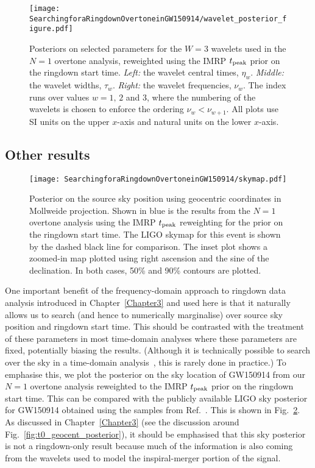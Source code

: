 \begin{figure}[t]
    \centering
    \texttt{[image: SearchingforaRingdownOvertoneinGW150914/wavelet\_posterior\_figure.pdf]}
    \caption[Posteriors on selected wavelet parameters]{ 
    Posteriors on selected parameters for the $W=3$ wavelets used in the $N=1$ overtone analysis, reweighted using the IMRP $t_{\rm peak}$ prior on the ringdown start time.
    \emph{Left:} the wavelet central times, $\eta_w$.
    \emph{Middle:} the wavelet widths, $\tau_w$.
    \emph{Right:} the wavelet frequencies, $\nu_w$. 
    The index runs over values $w=1,\,2$ and $3$, where the numbering of the wavelets is chosen to enforce the ordering $\nu_{w}<\nu_{w+1}$.
    All plots use SI units on the upper $x$-axis and natural units on the lower $x$-axis. 
    }
    \label{fig:wavelet}
\end{figure}



\subsection{Other results}\label{subsec:other_results}

\begin{figure}[t]
    \centering
    \texttt{[image: SearchingforaRingdownOvertoneinGW150914/skymap.pdf]}
    \caption[Posterior on the GW150914 sky location]{ 
    Posterior on the source sky position using geocentric coordinates in Mollweide projection.
    Shown in blue is the results from the $N=1$ overtone analysis using the IMRP $t_{\rm peak}$ reweighting for the prior on the ringdown start time.
    The LIGO skymap for this event is shown by the dashed black line for comparison.
    The inset plot shows a zoomed-in map plotted using right ascension and the sine of the declination.
    In both cases, 50\% and 90\% contours are plotted.
    }
    \label{fig:skymap}
\end{figure}

One important benefit of the frequency-domain approach to ringdown data analysis introduced in Chapter~\ref{Chapter3} and used here is that it naturally allows us to search (and hence to numerically marginalise) over source sky position and ringdown start time. 
This should be contrasted with the treatment of these parameters in most time-domain analyses where these parameters are fixed, potentially biasing the results. (Although it is technically possible to search over the sky in a time-domain analysis~\cite{Carullo:2019flw, Isi:2021iql}, this is rarely done in practice.)
To emphasise this, we plot the posterior on the sky location of GW150914 from our $N=1$ overtone analysis reweighted to the IMRP $t_{\rm peak}$ prior on the ringdown start time.
This can be compared with the publicly available LIGO sky posterior for GW150914 obtained using the samples from Ref.~\cite{skysamples}.
This is shown in Fig.~\ref{fig:skymap}.
As discussed in Chapter~\ref{Chapter3} (see the discussion around Fig.~\ref{fig:t0_geocent_posterior}), it should be emphasised that this sky posterior is not a ringdown-only result because much of the information is also coming from the wavelets used to model the inspiral-merger portion of the signal.

